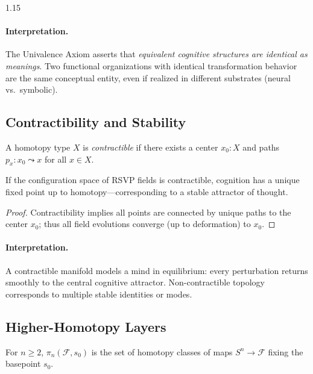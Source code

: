\documentclass[12pt,a4paper]{article}
\begin{document}
\begin{spacing}{1.15}
\paragraph{Interpretation.}
The Univalence Axiom asserts that
\emph{equivalent cognitive structures are identical as meanings}.
Two functional organizations with identical transformation behavior
are the same conceptual entity,
even if realized in different substrates (neural vs.\ symbolic).

\subsection{Contractibility and Stability}

\begin{definition}
\label{def:contractible}
A homotopy type \(X\) is \emph{contractible}
if there exists a center \(x_0:X\)
and paths \(p_x:x_0\leadsto x\) for all \(x\in X\).
\end{definition}

\begin{proposition}
\label{prop:stable}
If the configuration space of RSVP fields
is contractible, cognition has a unique fixed point
up to homotopy—corresponding to a stable attractor of thought.
\end{proposition}

\begin{proof}
Contractibility implies all points are connected by unique paths
to the center \(x_0\);
thus all field evolutions converge (up to deformation) to \(x_0\).
\end{proof}

\paragraph{Interpretation.}
A contractible manifold models a mind in equilibrium:
every perturbation returns smoothly to the central cognitive attractor.
Non-contractible topology corresponds to multiple stable identities or modes.

\subsection{Higher-Homotopy Layers}

\begin{definition}
\label{def:higherpi}
For \(n\ge2\),
\(\pi_n(\mathscr{F},s_0)\)
is the set of homotopy classes of maps
\(S^n\to\mathscr{F}\)
fixing the basepoint \(s_0\).
\end{definition}


\end{spacing}
\end{document}
